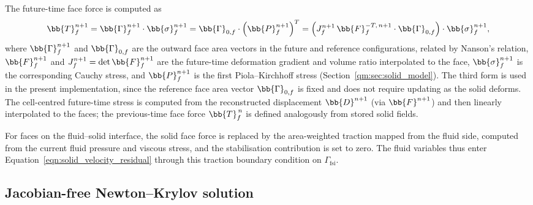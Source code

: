 The future-time face force is computed as
\begin{equation}
\bb{T}_f^{n+1}
= \bb{\Gamma}_f^{n+1} \cdot \bb{\sigma}_f^{n+1}
= \bb{\Gamma}_{0,f} \cdot \left(\bb{P}_f^{n+1}\right)^T
= \left(J_f^{n+1}\, \bb{F}_f^{-T,\,n+1} \cdot \bb{\Gamma}_{0,f}\right) \cdot \bb{\sigma}_f^{n+1},
\label{qm:eqn:face_force}
\end{equation}
where $\bb{\Gamma}_f^{n+1}$ and $\bb{\Gamma}_{0,f}$ are the outward face area vectors in the future and reference configurations, related by Nanson's relation, $\bb{F}_f^{n+1}$ and $J_f^{n+1} = \det \bb{F}_f^{n+1}$ are the future-time deformation gradient and volume ratio interpolated to the face, $\bb{\sigma}_f^{n+1}$ is the corresponding Cauchy stress, and $\bb{P}_f^{n+1}$ is the first Piola--Kirchhoff stress (Section~\ref{qm:sec:solid_model}). The third form is used in the present implementation, since the reference face area vector $\bb{\Gamma}_{0,f}$ is fixed and does not require updating as the solid deforms.
The cell-centred future-time stress is computed from the reconstructed displacement $\bb{D}^{n+1}$ (via $\bb{F}^{n+1}$) and then linearly interpolated to the faces; the previous-time face force $\bb{T}^{\,n}_f$ is defined analogously from stored solid fields.

For faces on the fluid--solid interface, the solid face force is replaced by the area-weighted traction mapped from the fluid side, computed from the current fluid pressure and viscous stress, and the stabilisation contribution is set to zero.
The fluid variables thus enter Equation~\eqref{eqn:solid_velocity_residual} through this traction boundary condition on $\Gamma_\mathrm{fsi}$.



\subsection{Jacobian-free Newton--Krylov solution}
\label{qm:sec:jfnk_solution}

